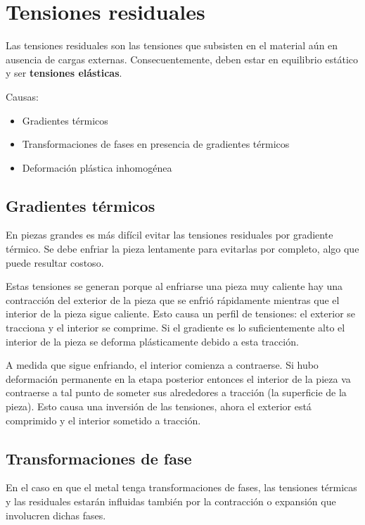 \section{Tensiones residuales}

Las tensiones residuales son las tensiones que subsisten en el material aún en ausencia de cargas externas. Consecuentemente, deben estar en equilibrio estático y ser \textbf{tensiones elásticas}.

Causas:
\begin{itemize}
	\item Gradientes térmicos
	\item Transformaciones de fases en presencia de gradientes térmicos
	\item Deformación plástica inhomogénea
\end{itemize}

\subsection{Gradientes térmicos}

En piezas grandes es más difícil evitar las tensiones residuales por gradiente térmico. Se debe enfriar la pieza lentamente para evitarlas por completo, algo que puede resultar costoso.

Estas tensiones se generan porque al enfriarse una pieza muy caliente hay una contracción del exterior de la pieza que se enfrió rápidamente mientras que el interior de la pieza sigue caliente. Esto causa un perfil de tensiones: el exterior se tracciona y el interior se comprime. Si el gradiente es lo suficientemente alto el interior de la pieza se deforma plásticamente debido a esta tracción.

A medida que sigue enfriando, el interior comienza a contraerse. Si hubo deformación permanente en la etapa posterior entonces el interior de la pieza va contraerse a tal punto de someter sus alrededores a tracción (la superficie de la pieza). Esto causa una inversión de las tensiones, ahora el exterior está comprimido y el interior sometido a tracción.

\subsection{Transformaciones de fase}
En el caso en que el metal tenga transformaciones de fases, las tensiones térmicas y las residuales estarán influidas también por la contracción o expansión que involucren dichas fases.


